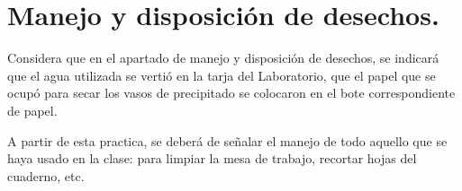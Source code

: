 \documentclass[14pt]{extarticle}
\begin{document}
\section{Manejo y disposición de desechos.}

Considera que en el apartado de manejo y disposición de desechos, se indicará que el agua utilizada se vertió en la tarja del Laboratorio, que el papel que se ocupó para secar los vasos de precipitado se colocaron en el bote correspondiente de papel.

A partir de esta practica, se deberá de señalar el manejo de todo aquello que se haya usado en la clase: para limpiar la mesa de trabajo, recortar hojas del cuaderno, etc.
\end{document}
